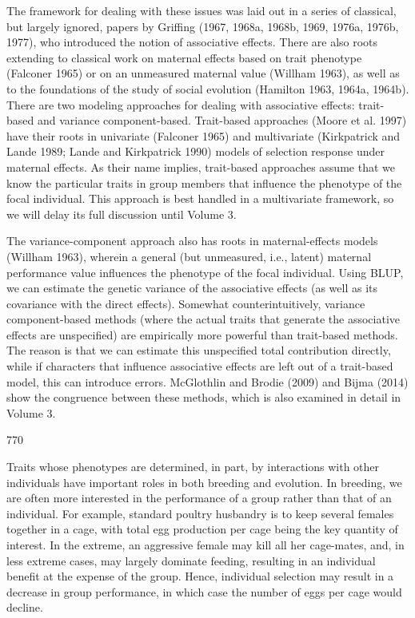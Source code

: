 \documentclass{article}
\begin{document}
The framework for dealing with these issues was laid out in a series of classical, but largely ignored, papers by Griffing (1967, 1968a, 1968b, 1969, 1976a, 1976b, 1977), who introduced the notion of associative effects. There are also roots extending to classical work on maternal effects based on trait phenotype (Falconer 1965) or on an unmeasured maternal value (Willham 1963), as well as to the foundations of the study of social evolution (Hamilton 1963, 1964a, 1964b). There are two modeling approaches for dealing with associative effects: trait-based and variance component-based. Trait-based approaches (Moore et al. 1997) have their roots in univariate (Falconer 1965) and multivariate (Kirkpatrick and Lande 1989; Lande and Kirkpatrick 1990) models of selection response under maternal effects. As their name implies, trait-based approaches assume that we know the particular traits in group members that influence the phenotype of the focal individual. This approach is best handled in a multivariate framework, so we will delay its full discussion until Volume 3.

The variance-component approach also has roots in maternal-effects models (Willham 1963), wherein a general (but unmeasured, i.e., latent) maternal performance value influences the phenotype of the focal individual. Using BLUP, we can estimate the genetic variance of the associative effects (as well as its covariance with the direct effects). Somewhat counterintuitively, variance component-based methods (where the actual traits that generate the associative effects are unspecified) are empirically more powerful than trait-based methods. The reason is that we can estimate this unspecified total contribution directly, while if characters that influence associative effects are left out of a trait-based model, this can introduce errors. McGlothlin and Brodie (2009) and Bijma (2014) show the congruence between these methods, which is also examined in detail in Volume 3.

770

Traits whose phenotypes are determined, in part, by interactions with other individuals have important roles in both breeding and evolution. In breeding, we are often more interested in the performance of a group rather than that of an individual. For example, standard poultry husbandry is to keep several females together in a cage, with total egg production per cage being the key quantity of interest. In the extreme, an aggressive female may kill all her cage-mates, and, in less extreme cases, may largely dominate feeding, resulting in an individual benefit at the expense of the group. Hence, individual selection may result in a decrease in group performance, in which case the number of eggs per cage would decline.
\end{document}

